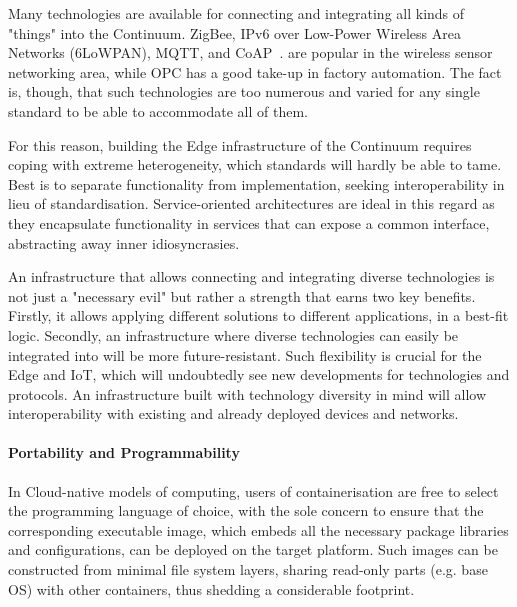 Many technologies are available for connecting and integrating all kinds of "things" into the Continuum. 
ZigBee, IPv6 over Low-Power Wireless Area Networks (6LoWPAN), MQTT, and CoAP~\cite{naik2017choice}. are popular in the wireless sensor networking area, while OPC \cite{gruner2016restful} has a good take-up in factory automation. 
The fact is, though, that such technologies are too numerous and varied for any single standard to be able to accommodate all of them.

For this reason, building the Edge infrastructure of the Continuum requires coping with extreme heterogeneity, which standards will hardly be able to tame.
Best is to separate functionality from implementation, seeking interoperability in lieu of standardisation. Service-oriented architectures are ideal in this regard as they encapsulate functionality in services that can expose a common interface, abstracting away inner idiosyncrasies.

An infrastructure that allows connecting and integrating diverse technologies is not just a "necessary evil" but rather a strength that earns two key benefits. Firstly, it allows applying different solutions to different applications, in a best-fit logic. 
Secondly, an infrastructure where diverse technologies can easily be integrated into will be more future-resistant. 
Such flexibility is crucial for the Edge and IoT, which will undoubtedly see new developments for technologies and protocols. An infrastructure built with technology diversity in mind will allow interoperability with existing and already deployed devices and networks.

\paragraph{Portability and Programmability}\label{p:portability-and-programmability}
In Cloud-native models of computing, users of containerisation are free to select the programming language of choice, with the sole concern to ensure that the corresponding executable image, which embeds all the necessary package libraries and configurations, can be deployed on the target platform. 
Such images can be constructed from minimal file system layers, sharing read-only parts (e.g. base OS) with other containers, thus shedding a considerable footprint. 

